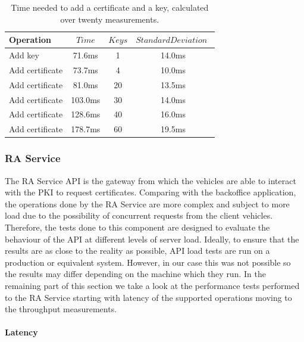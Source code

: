 \begin{table}
	\renewcommand{\arraystretch}{1.2} %
	\centering
	\begin{tabular}{lccc}
		\toprule
		Operation           & $Time$ & $Keys$& $StandardDeviation$ $$\\
		\midrule
		Add key          & 71.6ms & 1 & 14.0ms   \\
		Add certificate  & 73.7ms &4& 10.0ms     \\
		Add certificate  & 81.0ms &20& 13.5ms     \\
		Add certificate  & 103.0ms &30& 14.0ms     \\
		Add certificate  & 128.6ms &40& 16.0ms     \\
		Add certificate  & 178.7ms &60& 19.5ms \\
		\bottomrule
		\end{tabular}
		
		\caption{Time needed to add a certificate and a key, calculated over twenty measurements.}
		\label{tab:table1}
	\end{table}
	
	\subsubsection{RA Service}
	
	The RA Service API is the gateway from which the vehicles are able to interact with the PKI to request certificates. Comparing with the backoffice application, the operations done by the RA Service are more complex and subject to more load due to the possibility of concurrent requests from the client vehicles. Therefore, the tests done to this component are designed to evaluate the behaviour of the API at different levels of server load. Ideally, to ensure that the results are as close to the reality as possible, API load tests are run on a production or equivalent system. However, in our case this was not possible so the results may differ depending on the machine which they run. In the remaining part of this section we take a look at the performance tests performed to the RA Service starting with latency of the supported operations moving to the throughput measurements. 
	
	\paragraph{Latency}
	
